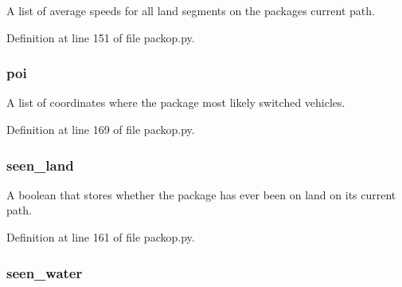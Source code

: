 A list of average speeds for all land segments on the package\textquotesingle{}s current path. 



Definition at line 151 of file packop.\+py.

\subsubsection[{\texorpdfstring{poi}{poi}}]{\setlength{\rightskip}{0pt plus 5cm}poi}\hypertarget{classsrc_1_1packop_1_1_package_aeed2d9226ad1fadceb4f10cdeb20992f}{}\label{classsrc_1_1packop_1_1_package_aeed2d9226ad1fadceb4f10cdeb20992f}


A list of coordinates where the package most likely switched vehicles. 



Definition at line 169 of file packop.\+py.

\subsubsection[{\texorpdfstring{seen\+\_\+land}{seen_land}}]{\setlength{\rightskip}{0pt plus 5cm}seen\+\_\+land}\hypertarget{classsrc_1_1packop_1_1_package_a9b051e33800c5a152ad902f886757d26}{}\label{classsrc_1_1packop_1_1_package_a9b051e33800c5a152ad902f886757d26}


A boolean that stores whether the package has ever been on land on its current path. 



Definition at line 161 of file packop.\+py.

\subsubsection[{\texorpdfstring{seen\+\_\+water}{seen_water}}]{\setlength{\rightskip}{0pt plus 5cm}seen\+\_\+water}\hypertarget{classsrc_1_1packop_1_1_package_a47ad90cdc00f18fca0d9499e89a6baab}{}\label{classsrc_1_1packop_1_1_package_a47ad90cdc00f18fca0d9499e89a6baab}


